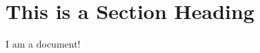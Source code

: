 \documentclass[a4paper, 12pt]{article}
\begin{document}
  \section{This is a Section Heading}
  I am a document!
\end{document}
